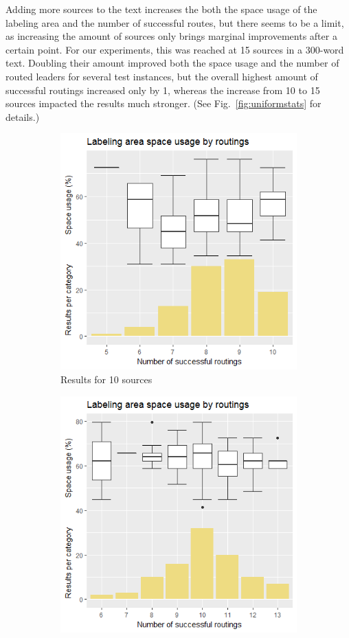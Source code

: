 \documentclass[11pt,a4paper]{vutinfth}
\begin{document}
Adding more sources to the text increases the both the space usage of the labeling area and the number of successful routes, but there seems to be a limit, as increasing the amount of sources only brings marginal improvements after a certain point. For our experiments, this was reached at 15 sources in a 300-word text. Doubling their amount improved both the space usage and the number of routed leaders for several test instances, but the overall highest amount of successful routings increased only by 1, whereas the increase from 10 to 15 sources impacted the results much stronger. (See Fig.~\ref*{fig:uniformstats} for details.)

 \begin{figure}
 	\centering
 	\begin{subfigure}[b]{/7}
 		\centering
 		\includegraphics[scale=0.35]{Rplot_10u.png}
 		\caption{\label{fig:10u}Results for 10 sources}
 	\end{subfigure}
 	\begin{subfigure}[b]{/7}
 		\centering
 		\includegraphics[scale=0.35]{Rplot_15u.png}

\end{subfigure}
\end{figure}
\end{document}

